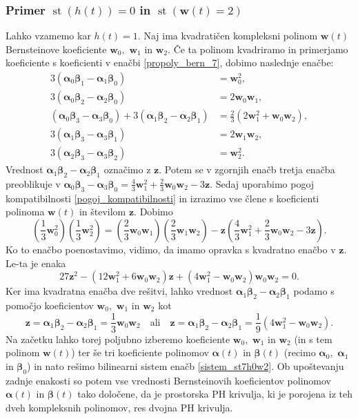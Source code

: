 \documentclass[12pt,a4paper,twoside]{article}
\theoremstyle{definition} %
\theoremstyle{plain} %
\numberwithin{equation}{section}  %
\newcommand{\wV}{\mathbf{w}}
\newcommand{\zV}{\mathbf{z}}
\newcommand{\balpha}{\boldsymbol \alpha}
\newcommand{\bbeta}{\boldsymbol \beta}
\DeclareMathOperator{\st}{st}
\begin{document}
\subsubsection{Primer \texorpdfstring{$\st(h(t))=0$}{st(h(t))=0} in \texorpdfstring{$\st(\wV(t)=2)$}{st(w(t))=2}}

Lahko vzamemo kar $h(t)=1.$ Naj ima kvadratičen kompleksni polinom $\wV(t)$ Bernsteinove koeficiente $\wV_0,$ $\wV_1$ in $\wV_2.$ Če ta polinom kvadriramo in primerjamo koeficiente s koeficienti v enačbi \eqref{propoly_bern_7}, dobimo naslednje enačbe:
\begin{align}
	3(\balpha_0\bbeta_1-\balpha_1\bbeta_0)&=\wV_0^2,\nonumber\\
	3(\balpha_0\bbeta_2-\balpha_2\bbeta_0)&=2\wV_0\wV_1,\nonumber\\
	(\balpha_0\bbeta_3-\balpha_3\bbeta_0)+3(\balpha_1\bbeta_2-\balpha_2\bbeta_1)&=\frac{2}{3}(2\wV_1^2+\wV_0\wV_2),\nonumber\\
	3(\balpha_1\bbeta_3-\balpha_3\bbeta_1)&=2\wV_1\wV_2,\nonumber\\
	3(\balpha_2\bbeta_3-\balpha_3\bbeta_2)&=\wV_2^2.\label{sistem_st7h0w2}
\end{align}
Vrednost $\balpha_1\bbeta_2-\balpha_2\bbeta_1$ označimo z $\zV.$ Potem se v zgornjih enačb tretja enačba preoblikuje v $\balpha_0\bbeta_3-\balpha_3\bbeta_0=\frac{4}{3}\wV_1^2+\frac{2}{3}\wV_0\wV_2-3\zV.$ Sedaj uporabimo pogoj kompatibilnosti \eqref{pogoj_kompatibilnosti} in izrazimo vse člene s koeficienti polinoma $\wV(t)$ in številom $\zV.$ Dobimo
\begin{equation*}
	\left(\frac{1}{3}\wV_0^2\right)\left(\frac{1}{3}\wV_2^2\right)=\left(\frac{2}{3}\wV_0\wV_1\right)\left(\frac{2}{3}\wV_1\wV_2\right)-\zV\left(\frac{4}{3}\wV_1^2+\frac{2}{3}\wV_0\wV_2-3\zV\right).
\end{equation*}
Ko to enačbo poenostavimo, vidimo, da imamo opravka s kvadratno enačbo v $\zV.$ Le-ta je enaka
\begin{equation*}
	27\zV^2-(12\wV_1^2+6\wV_0\wV_2)\zV+(4\wV_1^2-\wV_0\wV_2)\wV_0\wV_2=0.
\end{equation*}
Ker ima kvadratna enačba dve rešitvi, lahko vrednost $\balpha_1\bbeta_2-\balpha_2\bbeta_1$ podamo s pomočjo koeficientov $\wV_0,$ $\wV_1$ in $\wV_2$ kot
\begin{equation}
	\label{st7h0w2}
	\zV=\balpha_1\bbeta_2-\balpha_2\bbeta_1=\frac{1}{3}\wV_0\wV_2\quad\text{ali}\quad\zV=\balpha_1\bbeta_2-\balpha_2\bbeta_1=\frac{1}{9}(4\wV_1^2-\wV_0\wV_2).
\end{equation}
Na začetku lahko torej poljubno izberemo koeficiente $\wV_0,$ $\wV_1$ in $\wV_2$ (in s tem polinom $\wV(t)$) ter še tri koeficiente polinomov $\balpha(t)$ in $\bbeta(t)$ (recimo $\balpha_0,$ $\balpha_1$ in $\bbeta_0$) in nato rešimo bilinearni sistem enačb \eqref{sistem_st7h0w2}. Ob upoštevanju zadnje enakosti so potem vse vrednosti Bernsteinovih koeficientov polinomov $\balpha(t)$ in $\bbeta(t)$ tako določene, da je prostorska PH krivulja, ki je porojena iz teh dveh kompleksnih polinomov, res dvojna PH krivulja.
\end{document}
